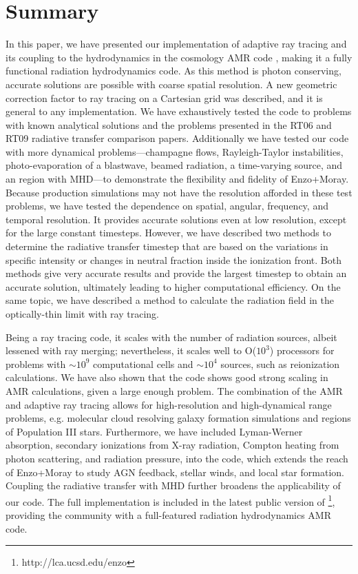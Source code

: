 \documentclass[apj,onecolumn]{emulateapj}
\begin{document}
\section{Summary}

In this paper, we have presented our implementation of adaptive ray
tracing \citep{Abel02_RT} and its coupling to the hydrodynamics in the
cosmology AMR code \enzo, making it a fully functional radiation
hydrodynamics code.  As this method is photon conserving, accurate
solutions are possible with coarse spatial resolution.  A new
geometric correction factor to ray tracing on a Cartesian grid was
described, and it is general to any implementation.  We have
exhaustively tested the code to problems with known analytical
solutions and the problems presented in the RT06 and RT09 radiative
transfer comparison papers.  Additionally we have tested our code with
more dynamical problems---champagne flows, Rayleigh-Taylor
instabilities, photo-evaporation of a blastwave, beamed radiation, a
time-varying source, and an  region with MHD---to
demonstrate the flexibility and fidelity of Enzo+Moray.  Because
production simulations may not have the resolution afforded in these
test problems, we have tested the dependence on spatial, angular,
frequency, and temporal resolution.  It provides accurate solutions
even at low resolution, except for the large constant timesteps.
However, we have described two methods to determine the radiative
transfer timestep that are based on the variations in specific
intensity or changes in neutral fraction inside the ionization front.
Both methods give very accurate results and provide the largest
timestep to obtain an accurate solution, ultimately leading to higher
computational efficiency.  On the same topic, we have described a
method to calculate the radiation field in the optically-thin limit
with ray tracing.

Being a ray tracing code, it scales with the number of radiation
sources, albeit lessened with ray merging; nevertheless, it scales
well to O($10^3$) processors for problems with $\sim10^9$
computational cells and $\sim10^4$ sources, such as reionization
calculations.  We have also shown that the code shows good strong
scaling in AMR calculations, given a large enough problem.  The
combination of the AMR and adaptive ray tracing allows for
high-resolution and high-dynamical range problems, e.g. molecular
cloud resolving galaxy formation simulations and  regions of
Population III stars.  Furthermore, we have included Lyman-Werner
absorption, secondary ionizations from X-ray radiation, Compton
heating from photon scattering, and radiation pressure, into the code,
which extends the reach of Enzo+Moray to study AGN feedback, stellar
winds, and local star formation.  Coupling the radiative transfer with
MHD further broadens the applicability of our code.  The full
implementation is included in the latest public version of
\enzo\footnote{http://lca.ucsd.edu/enzo}, providing the community with
a full-featured radiation hydrodynamics AMR code.
\end{document}
